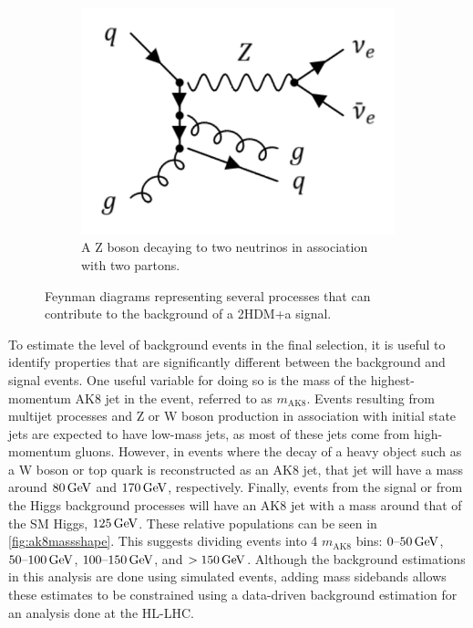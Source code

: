 \begin{figure}[ht]
\begin{subfigure}[b]{0.25\textwidth}
         \label{fig:ttbar}
     \end{subfigure}
    \begin{subfigure}[b]{0.25\textwidth}
         \includegraphics[width=\textwidth]{Chapters/Signal_Extraction/z+jets.pdf}
         \caption{A Z boson decaying to two neutrinos in association with two partons.}
         \label{fig:z+jets}
     \end{subfigure}
\caption{Feynman diagrams representing several processes that can contribute to the background of a 2HDM+a signal.}
\end{figure}

To estimate the level of background events in the final selection, it is useful to identify properties that are significantly different between the background and signal events. One useful variable for doing so is the mass of the highest-momentum AK8 jet in the event, referred to as $m_{\text{AK8}}$. 
Events resulting from multijet processes and Z or W boson production in association with initial state jets are expected to have low-mass jets, as most of these jets come from high-momentum gluons. 
However, in events where the decay of a heavy object such as a W boson or top quark is reconstructed as an AK8 jet, that jet will have a mass around $\GeV{80}$ and $\GeV{170}$, respectively. 
Finally, events from the signal or from the Higgs background processes will have an AK8 jet with a mass around that of the SM Higgs, $\GeV{125}$. These relative populations can be seen in \cref{fig:ak8massshape}. 
This suggests dividing events into 4 $m_\text{AK8}$ bins: $0\text{--}\GeV{50}$, $50\text{--}\GeV{100}$, $100\text{--}\GeV{150}$, and $>\GeV{150}$. Although the background estimations in this analysis are done using simulated events, adding mass sidebands allows these estimates to be constrained using a data-driven background estimation for an analysis done at the HL-LHC.

